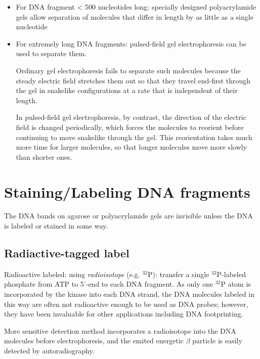   \begin{itemize}
    \item  For DNA fragment < 500 nucleotides long: specially designed
    polyacrylamide gels allow separation of molecules that differ in length by
    as little as a single nucleotide 
    
    \item For extremely long DNA fragments: pulsed-field gel electrophoresis can
    be used to separate them.
    
    Ordinary gel electrophoresis fails to separate such molecules because the
    steady electric field stretches them out so that they travel end-first
    through the gel in snakelike configurations at a rate that is independent of
    their length.
    
    In pulsed-field gel electrophoresis, by contrast, the direction of the
    electric field is changed periodically, which forces the molecules to
    reorient before continuing to move snakelike through the gel. This
    reorientation takes much more time for larger molecules, so that longer
    molecules move more slowly than shorter ones.    
  
  \end{itemize}


\section{Staining/Labeling DNA fragments}

The DNA bands on agarose or polyacrylamide gels are invisible unless the DNA is
labeled or stained in some way.
  
  
\subsection{Radiactive-tagged label}

Radioactive labeled: using {\it radioisotope} (e.g. $^{32}$P):
transfer a single $^{32}$P-labeled phosphate from ATP to 5'-end to each DNA
fragment. As  only one $^{32}$P atom is incorporated by the kinase into each DNA
strand, the DNA molecules labeled in this way are often not radioactive enough
to be used as DNA probes; however, they have been invaluable for other
applications including DNA footprinting.

More sensitive detection method incorporates a radioisotope into the DNA
molecules before electrophoresis, and the emited energetic $\beta$ particle is
easily detected by autoradiography.

